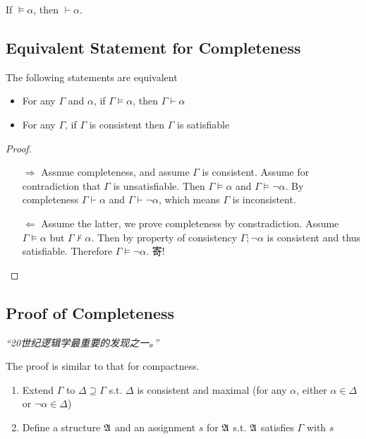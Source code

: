\begin{corollary}
    If $\vDash\alpha$, then $\vdash\alpha$.
\end{corollary}

\subsection{Equivalent Statement for Completeness}

\begin{theorem}
    The following statements are equivalent
    \begin{itemize}
        \item For any $\Gamma$ and $\alpha$, if $\Gamma\vDash\alpha$, then $\Gamma\vdash\alpha$
        \item For any $\Gamma$, if $\Gamma$ is consistent then $\Gamma$ is satisfiable
    \end{itemize}
\end{theorem}
\begin{proof}
    \begin{itemize}
        \item[$\Rightarrow$] Assmue completeness, and assume $\Gamma$ is consistent. Assume for contradiction that $\Gamma$ is unsatisfiable. Then $\Gamma\vDash\alpha$ and $\Gamma\vDash\neg\alpha$. By completeness $\Gamma\vdash\alpha$ and $\Gamma\vdash\neg\alpha$, which means $\Gamma$ is inconsistent.
        \item[$\Leftarrow$] Assume the latter, we prove completeness by constradiction. Assume $\Gamma\vDash\alpha$ but $\Gamma\nvdash\alpha$. Then by property of consistency $\Gamma;\neg\alpha$ is consistent and thus satisfiable. Therefore $\Gamma\vDash\neg\alpha$. 寄!
    \end{itemize}
\end{proof}

\subsection{Proof of Completeness}

\emph{“20世纪逻辑学最重要的发现之一。”}

The proof is similar to that for compactness.

\begin{enumerate}
    \item Extend $\Gamma$ to $\Delta\supseteq\Gamma$ s.t. $\Delta$ is consistent and maximal (for any $\alpha$, either $\alpha\in\Delta$ or $\neg\alpha\in\Delta$)
    \item Define a structure $\mathfrak{A}$ and an assignment $s$ for $\mathfrak{A}$ s.t. $\mathfrak{A}$ satisfies $\Gamma$ with $s$
\end{enumerate}

